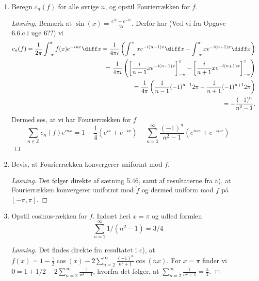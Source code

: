 \begin{opg}
\begin{enumerate}
\begin{proof}[Løsning]
\begin{equation*}
			c_{\pm 1}(f)=\frac{1}{2\pi}\int_{-\pi}^{\pi}f(x)e^{\mp ix} \diff x=\frac{1}{2\pi}\int_{-\pi}^{\pi}x\sin(x)\cos(x) \diff x=\frac{1}{2\pi}\left[\frac{x}{2}\sin^2(x)\right]_{-\pi}^{\pi}-\frac{1}{4\pi}\int_{-\pi}^{\pi}\sin^2(x)\diff x=-\frac{1}{4},
			\end{equation*}
			hvor vi har brugt partiel integration, og 
			$$
			c_0(f)=\frac{1}{2\pi}\int_{-\pi}^{\pi}x\sin(x)\diff x=\frac{1}{2\pi}\left[x(-\cos(x))\right]_{-\pi}^{\pi}+\frac{1}{2\pi}\int_{-\pi}^{\pi}\cos(x)\diff x=1,
			$$
			hvor vi igen har brugt partiel integration.
		\end{proof}
		\fi
		\item Beregn $ c_n(f) $ for alle øvrige $ n $, og opstil Fourierrækken for $ f $. 
		\ifanswers
		\begin{proof}[Løsning]
			Bemærk at $ \sin(x)=\frac{e^{ix}-e^{-ix}}{2i} $. Derfor har (Ved vi fra Opgave 6.6.c.i uge 6??) vi\begin{equation*}
			\begin{aligned}
			c_n(f)=\frac{1}{2\pi}\int_{-\pi}^{\pi}f(x)e^{-inx}\diff x=\frac{1}{4\pi i} \left(\int_{-\pi}^{\pi}xe^{-i(n-1)x}\diff x-\int_{-\pi}^{\pi}xe^{-i(n+1)x}\diff x\right)\\
			=\frac{1}{4\pi i} \left(\left[\frac{i}{n-1}xe^{-i(n-1)x}\right]_{-\pi}^{\pi}-\left[\frac{i}{n+1}xe^{-i(n+1)x}\right]_{-\pi}^{\pi}\right)\\
			=\frac{1}{4\pi}\left(\frac{1}{n-1}(-1)^{n-1}2\pi-\frac{1}{n+1}(-1)^{n+1}2\pi\right)\\
			=-\frac{(-1)^n}{n^2-1}.
			\end{aligned}
			\end{equation*}
			Dermed ses, at vi har Fourierrækken for $ f $
			$$
			\sum_{n\in \mathbb{Z}}c_n(f)e^{inx}=1-\frac{1}{4}(e^{ix}+e^{-ix})-\sum_{n=2}^{\infty}\frac{(-1)^n}{n^2-1}\left(e^{inx}+e^{-inx}\right)
			$$
		\end{proof}
		\fi
		\item Bevis, at Fourierrækken konvergerer uniformt mod $ f $.
		\ifanswers
		\begin{proof}[Løsning]
			Det følger direkte af sætning 5.46, samt af resultaterne fra a), at Fourierrækken konvergerer uniformt mod $ \tilde{f} $ og dermed uniform mod $ f $ på $ [-\pi,\pi] $.
		\end{proof}
		\fi
		\item Opstil cosinus-rækken for $ f $. Indsæt heri $ x=\pi $ og udled formlen
		$$
		\sum_{n=2}^\infty 1/(n^2-1)=3/4
		$$
		\ifanswers
		\begin{proof}[Løsning]
			Det findes direkte fra resultatet i c), at $ f(x)=1-\frac{1}{2}\cos(x)-2\sum_{n=2}^{\infty}\frac{(-1)^n}{n^2+1}\cos(nx) $. For $ x=\pi $ finder vi $ 0=1+1/2-2\sum_{n=2}^{\infty}\frac{1}{n^2+1} $, hvorfra det følger, at $ \sum_{n=2}^{\infty}\frac{1}{n^2+1}=\frac{3}{4} $.
		\end{proof}
		\fi
	\end{enumerate}
\end{opg}


